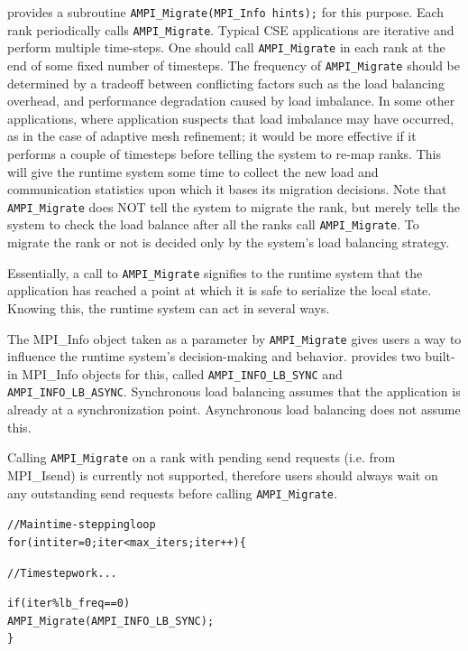 \documentclass[10pt]{article}
\begin{document}
\ampi{} provides a subroutine \texttt{AMPI\_Migrate(MPI\_Info hints);} for
this purpose. Each rank periodically calls \texttt{AMPI\_Migrate}. Typical
CSE applications are iterative and perform multiple time-steps. One should call
\texttt{AMPI\_Migrate} in each rank at the end of some fixed number of
timesteps. The frequency of \texttt{AMPI\_Migrate} should be determined by a
tradeoff between conflicting factors such as the load balancing overhead, and
performance degradation caused by load imbalance. In some other applications,
where application suspects that load imbalance may have occurred, as in the
case of adaptive mesh refinement; it would be more effective if it performs a
couple of timesteps before telling the system to re-map ranks. This will give
the \ampi{} runtime system some time to collect the new load and communication
statistics upon which it bases its migration decisions. Note that
\texttt{AMPI\_Migrate} does NOT tell the system to migrate the rank, but
merely tells the system to check the load balance after all the ranks call
\texttt{AMPI\_Migrate}. To migrate the rank or not is decided only by the
system's load balancing strategy.

Essentially, a call to \texttt{AMPI\_Migrate} signifies to the runtime system
that the application has reached a point at which it is safe to serialize
the local state. Knowing this, the runtime system can act in several ways.

The MPI\_Info object taken as a parameter by \texttt{AMPI\_Migrate} gives
users a way to influence the runtime system's decision-making and behavior.
\ampi{} provides two built-in MPI\_Info objects for this, called \texttt{AMPI\_INFO\_LB\_SYNC}
and \texttt{AMPI\_INFO\_LB\_ASYNC}. Synchronous load balancing assumes that
the application is already at a synchronization point. Asynchronous load balancing
does not assume this.

Calling \texttt{AMPI\_Migrate} on a rank with pending send requests (i.e. from MPI\_Isend)
is currently not supported, therefore users should always wait on any outstanding send requests
before calling \texttt{AMPI\_Migrate}.

\begin{alltt}
// Main time-stepping loop
for (int iter=0; iter < max_iters; iter++) \{

  // Time step work ...

  if (iter \% lb_freq == 0)
    AMPI_Migrate(AMPI_INFO_LB_SYNC);
\}
\end{alltt}
\end{document}
